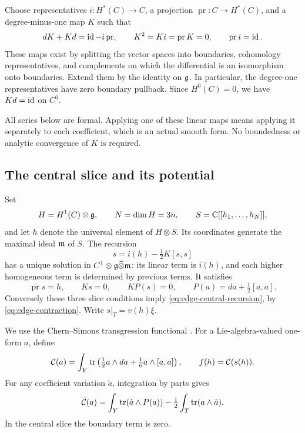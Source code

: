 Choose representatives $i:H^*(C)\to C$, a projection
$\operatorname{pr}:C\to H^*(C)$, and a degree-minus-one map $K$ such that
\begin{equation}
\label{eq:edge-contraction}
 dK+Kd=\operatorname{id}-i\operatorname{pr},\qquad
 K^2=Ki=\operatorname{pr}K=0,\qquad
 \operatorname{pr}i=\operatorname{id}.
\end{equation}
These maps exist by splitting the vector spaces into boundaries,
cohomology representatives, and complements on which the differential
is an isomorphism onto boundaries.  Extend them by the identity on
$\mathfrak{g}$.  In particular, the degree-one representatives have zero
boundary pullback.  Since $H^0(C)=0$, we have $Kd=\operatorname{id}$ on $C^0$.

All series below are formal.  Applying one of these linear maps means
applying it separately to each coefficient, which is an actual smooth
form.  No boundedness or analytic convergence of $K$ is required.

\subsection{The central slice and its potential}

Set
\[
 H=H^1(C)\otimes\mathfrak{g},\qquad N=\dim H=3n,
 \qquad S=\mathbb C[[h_1,\ldots,h_N]],
\]
and let $h$ denote the universal element of $H\otimes S$.  Its
coordinates generate the maximal ideal $\mathfrak{m}$ of $S$.  The recursion
\begin{equation}
\label{eq:edge-central-recursion}
 s=i(h)-\tfrac12K[s,s]
\end{equation}
has a unique solution in $C^1\otimes\mathfrak{g}\widehat\otimes\mathfrak{m}$: its linear
term is $i(h)$, and each higher homogeneous term is determined by
previous terms.  It satisfies
\[
 \operatorname{pr}s=h,\qquad Ks=0,
 \qquad K P(s)=0,
 \qquad P(a)=da+\tfrac12[a,a].
\]
Conversely these three slice conditions imply
\eqref{eq:edge-central-recursion}, by
\eqref{eq:edge-contraction}.  Write $s|_T=v(h)\xi$.

We use the Chern--Simons transgression functional
\cite[Section~3]{ChernSimons1974}. For a Lie-algebra-valued one-form $a$,
define
\begin{equation}
\label{eq:edge-cs}
 \mathcal C(a)=\int_Y\operatorname{tr}\left(
        \tfrac12a\wedge da+\tfrac16a\wedge[a,a]\right),
 \qquad f(h)=\mathcal C(s(h)).
\end{equation}
For any coefficient variation $\dot a$, integration by parts gives
\begin{equation}
\label{eq:edge-variation}
 \dot{\mathcal C}(a)
   =\int_Y\operatorname{tr}(\dot a\wedge P(a))
       -\tfrac12\int_T\operatorname{tr}(a\wedge\dot a).
\end{equation}
In the central slice the boundary term is zero.

